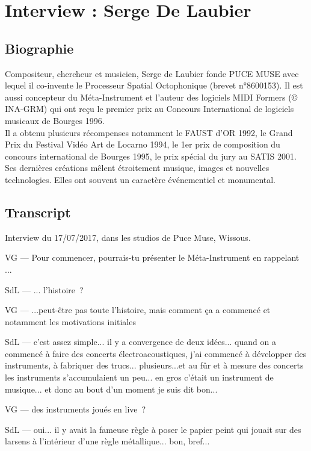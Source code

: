 \chapter{Interview : Serge De Laubier}
\label{appendix:delaubier}
\section*{Biographie}

\noindent Compositeur, chercheur et musicien, Serge de Laubier fonde PUCE MUSE avec lequel il co-invente le Processeur Spatial Octophonique (brevet n°8600153). Il est aussi concepteur du Méta-Instrument et l’auteur des logiciels MIDI Formers (© INA-GRM) qui ont reçu le premier prix au Concours International de logiciels musicaux de Bourges 1996.\\
\indent Il a obtenu plusieurs récompenses notamment le FAUST d’OR 1992, le Grand Prix du Festival Vidéo Art de Locarno 1994, le 1er prix de composition du concours international de Bourges 1995, le prix spécial du jury au SATIS 2001.\\
\indent Ses dernières créations mêlent étroitement musique, images et nouvelles technologies. Elles ont souvent un caractère événementiel et monumental. 


\section*{Transcript}
\noindent Interview du 17/07/2017, dans les studios de Puce Muse, Wissous.

VG — Pour commencer, pourrais-tu présenter le Méta-Instrument en rappelant ...

SdL — ... l'histoire ? 

VG — ...peut-être pas toute l'histoire, mais comment ça a commencé et notamment les motivations initiales 

SdL — c'est assez simple... il y a convergence de deux idées... quand on a commencé à faire des concerts électroacoustiques, j'ai commencé à développer des instruments, à fabriquer des trucs... plusieurs...et au fûr et à mesure des concerts les instruments s'accumulaient un peu... en gros c'était un instrument de musique... et donc au bout d'un moment je suis dit bon... 

VG — des instruments joués en live ? 

SdL — oui... il y avait la fameuse règle à poser le papier peint qui jouait sur des larsens à l'intérieur d'une règle métallique... bon, bref... 

